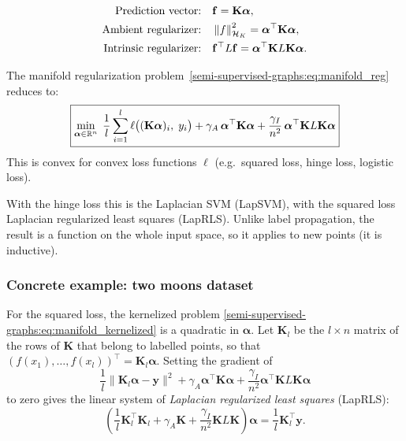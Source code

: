 \begin{notechapter}
\begin{align*}
\text{Prediction vector:} &\quad \mathbf{f} = \mathbf{K} \boldsymbol{\alpha}, \\
\text{Ambient regularizer:} &\quad \left\|f\right\|_{\mathcal{H}_K}^2
  = \boldsymbol{\alpha}^\top \mathbf{K} \boldsymbol{\alpha}, \\
\text{Intrinsic regularizer:} &\quad \mathbf{f}^\top L \mathbf{f}
  = \boldsymbol{\alpha}^\top \mathbf{K} L \mathbf{K} \boldsymbol{\alpha}.
\end{align*}

\begin{theorem}
\label{semi-supervised-graphs:thm:manifold_kernelized}
The manifold regularization problem~\eqref{semi-supervised-graphs:eq:manifold_reg} reduces to:
\begin{equation}
\label{semi-supervised-graphs:eq:manifold_kernelized}
\boxed{\min_{\boldsymbol{\alpha} \in \mathbb{R}^n}\;
\frac{1}{l}\sum_{i=1}^{l} \ell\bigl((\mathbf{K}\boldsymbol{\alpha})_i,\; y_i\bigr)
+ \gamma_A\,\boldsymbol{\alpha}^\top\mathbf{K}\boldsymbol{\alpha}
+ \frac{\gamma_I}{n^2}\,\boldsymbol{\alpha}^\top \mathbf{K}L\mathbf{K}\boldsymbol{\alpha}}
\end{equation}
This is convex for convex loss functions $\ell$ (e.g.\ squared loss,
hinge loss, logistic loss).
\end{theorem}

With the hinge loss this is the Laplacian SVM (LapSVM), with the squared loss Laplacian regularized least squares (LapRLS). Unlike label propagation, the result is a function on the whole input space, so it applies to new points (it is inductive).

\subsubsection*{Concrete example: two moons dataset}

For the squared loss, the kernelized problem \eqref{semi-supervised-graphs:eq:manifold_kernelized} is a quadratic in $\boldsymbol\alpha$. Let $\mathbf K_l$ be the $l\times n$ matrix of the rows of $\mathbf K$ that belong to labelled points, so that $(f(x_1), \ldots, f(x_l))^\top = \mathbf K_l\boldsymbol\alpha$. Setting the gradient of
\[
\frac{1}{l} \|\mathbf{K}_l \boldsymbol{\alpha} - \mathbf{y}\|^2
+ \gamma_A \boldsymbol{\alpha}^\top \mathbf{K} \boldsymbol{\alpha}
+ \frac{\gamma_I}{n^2} \boldsymbol{\alpha}^\top \mathbf{K}L\mathbf{K} \boldsymbol{\alpha}
\]
to zero gives the linear system of \emph{Laplacian regularized least squares} (LapRLS):
\begin{equation}
\left( \frac{1}{l} \mathbf{K}_l^\top \mathbf{K}_l + \gamma_A \mathbf{K}
+ \frac{\gamma_I}{n^2} \mathbf{K}L\mathbf{K} \right) \boldsymbol{\alpha}
= \frac{1}{l} \mathbf{K}_l^\top \mathbf{y}.
\label{semi-supervised-graphs:eq:laprls}
\end{equation}


\end{notechapter}
